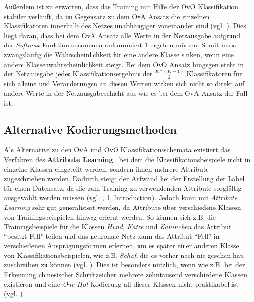 Außerdem ist zu erwarten, dass das Training mit Hilfe der OvO Klassifikation stabiler verläuft, da im Gegensatz zu dem OvA Ansatz die einzelnen Klassifikatoren innerhalb des Netzes unabhängiger voneinander sind (vgl. \cite{pawaraPaper}). Dies liegt daran, dass bei dem OvA Ansatz alle Werte in der Netzausgabe aufgrund der \textit{Softmax}-Funktion zusammen aufsummiert $1$ ergeben müssen. Somit muss zwangsläufig die Wahrscheinlichkeit für eine andere Klasse sinken, wenn eine andere Klassenwahrscheinlichkeit steigt. Bei dem OvO Ansatz hingegen steht in der Netzausgabe jedes Klassifikationsergebnis der $\frac{K*(K-1)}{2}$ Klassifikatoren für sich alleine und Veränderungen an diesen Werten wirken sich nicht so direkt auf andere Werte in der Netzausgabeschicht aus wie es bei dem OvA Ansatz der Fall ist.
\subsection{Alternative Kodierungsmethoden}
\label{ch:methodik_alternativen}
Als Alternative zu den OvA und OvO Klassifikationsschemata existiert das Verfahren des \textbf{Attribute Learning} \cite{attributeLearning, attributeLearningChinese}, bei dem die Klassifikationsbeispiele nicht in einzelne Klassen eingeteilt werden, sondern ihnen mehrere Attribute zugeschrieben werden. Dadurch steigt der Aufwand bei der Erstellung der Label für einen Datensatz, da die zum Training zu verwendenden Attribute sorgfältig ausgewählt werden müssen (vgl. \cite{pawaraPaper}, 1. Introduction). Jedoch kann mit \textit{Attribute Learning} sehr gut generalisiert werden, da Attribute über verschiedene Klassen von Trainingsbeispielen hinweg erlernt werden. So können sich z.B. die Trainingsbeispiele für die Klassen \textit{Hund}, \textit{Katze} und \textit{Kaninchen} das Attribut \enquote{besitzt Fell} teilen und das neuronale Netz kann das Attribut \enquote{Fell} in verschiedenen Ausprägungsformen erlernen, um es später einer anderen Klasse von Klassifikationsbeispielen, wie z.B. \textit{Schaf}, die es vorher noch nie gesehen hat, zuschreiben zu können (vgl. \cite{attributeLearning}). Dies ist besonders nützlich, wenn wie z.B. bei der Erkennung chinesischer Schriftzeichen mehrere zehntausend verschiedene Klassen existieren und eine \textit{One-Hot}-Kodierung all dieser Klassen nicht praktikabel ist (vgl. \cite{attributeLearningChinese}).\\

